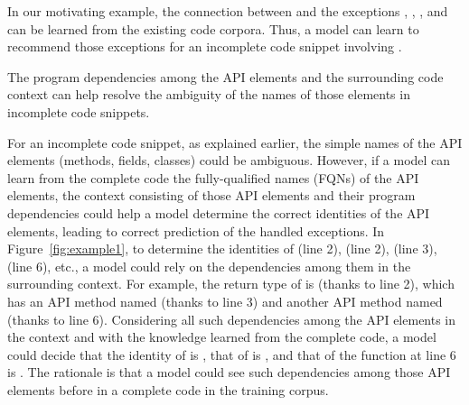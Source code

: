 In our motivating example, the connection between
 and the exceptions
, ,
, and
 can be learned from the existing
code corpora. Thus, a model can learn to recommend those exceptions
for an incomplete code snippet involving .

\begin{Observation} 
\label{ob4}
The program dependencies among the API elements and the surrounding
code context can help resolve the ambiguity of the names of those
elements in incomplete code snippets.
\end{Observation}

For an incomplete code snippet, as explained earlier, the simple names
of the API elements (methods, fields, classes) could be ambiguous.
However, if a model can learn from the complete code the
fully-qualified names (FQNs) of the API elements, the context
consisting of those API elements and their program dependencies
could help a model determine the correct identities of the API
elements, leading to correct prediction of the handled exceptions.
%
In Figure~\ref{fig:example1}, to determine the identities of
 (line 2),  (line 2),
 (line 3),  (line 6), etc., a model
could rely on the dependencies among them in the surrounding context.
For example, the return type of  is
 (thanks to line 2), which has an API method named
 (thanks to line 3) and another API method named
 (thanks to line 6). Considering all such dependencies among
the API elements in the context and with the knowledge learned from
the complete code, a model could decide that the identity of
 is , that of
 is
, and that of the
 function at line 6 is
. The rationale is that a
model could see such dependencies among those API elements before in
a complete code in the training corpus.



